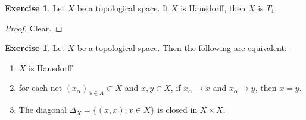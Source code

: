 \documentclass[12pt]{amsart}
\theoremstyle{definition}
\newtheorem{ex}[definition]{Exercise}
\newcommand{\al}{\alpha}
\newcommand{\Del}{\Delta}
\DeclareMathOperator*{\0}{\mbf{0}}
\DeclareMathOperator*{\1}{\mbf{1}}
\begin{document}
	\begin{ex}
		Let $X$ be a topological space. If $X$ is Hausdorff, then $X$ is $T_1$.
	\end{ex}
	
	\begin{proof}
		Clear.
	\end{proof}
	
	\begin{ex}
		Let $X$ be a topological space. Then the following are equivalent: 
		\begin{enumerate}
			\item $X$ is Hausdorff
			\item for each net $(x_{\al})_{\al \in A} \subset X$ and $x,y \in X$, if $x_{\al} \rightarrow x$ and $x_{\al} \rightarrow y$, then $x = y$.
			\item The diagonal $\Del_X = \{(x,x):x \in X\}$ is closed in $X \times X$.
		\end{enumerate} 
	\end{ex}
	
\end{document}
